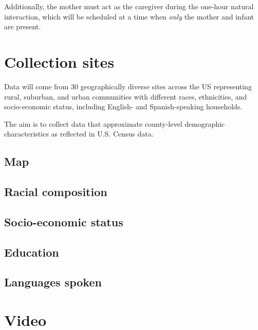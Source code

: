 \documentclass[
]{book}
\begin{document}
Additionally, the mother must act as the caregiver during the one-hour natural interaction, which will be scheduled at a time when \emph{only} the mother and infant are present.

\hypertarget{collection-sites}{%
\section{Collection sites}\label{collection-sites}}

Data will come from 30 geographically diverse sites across the US representing rural, suburban, and urban communities with different races, ethnicities, and socio-economic status, including English- and Spanish-speaking households.

The aim is to collect data that approximate county-level demographic characteristics as reflected in U.S. Census data.

\hypertarget{map}{%
\subsection{Map}\label{map}}

\hypertarget{racial-composition}{%
\subsection{Racial composition}\label{racial-composition}}

\hypertarget{socio-economic-status}{%
\subsection{Socio-economic status}\label{socio-economic-status}}

\hypertarget{education}{%
\subsection{Education}\label{education}}

\hypertarget{languages-spoken}{%
\subsection{Languages spoken}\label{languages-spoken}}

\hypertarget{video-1}{%
\section{Video}\label{video-1}}
\end{document}
